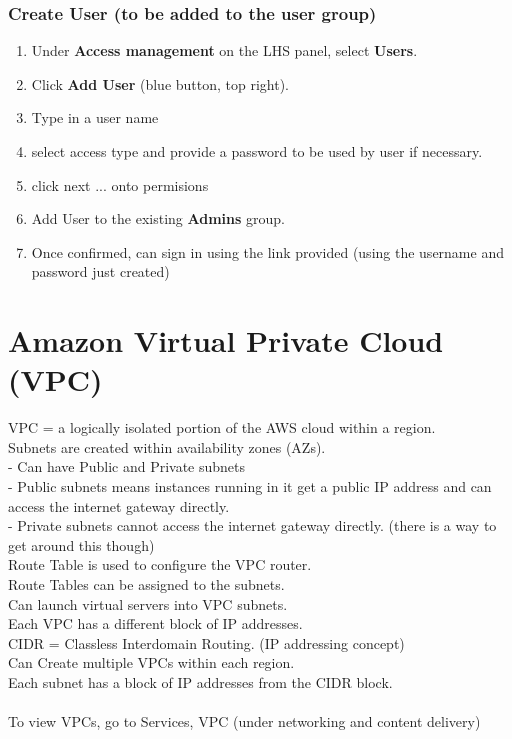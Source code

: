 \documentclass[11pt]{article}
\begin{document}
    \subsubsection{Create User (to be added to the user group)}
    \begin{enumerate}
        \item Under \textbf{Access management} on the LHS panel, select \textbf{Users}.
        \item Click \textbf{Add User} (blue button, top right).
        \item Type in a user name
        \item select access type and provide a password to be used by user if necessary.
        \item click next
        \subitem ... onto permisions
        \item Add User to the existing \textbf{Admins} group.
        \item Once confirmed, can sign in using the link provided (using the username and password just created)
    \end{enumerate}

    \section{Amazon Virtual Private Cloud (VPC)}
    VPC = a logically isolated portion of the AWS cloud within a region.
    \\
    Subnets are created within availability zones (AZs).
    \\
     - Can have Public and Private subnets
    \\
     - Public subnets means instances running in it get a public IP address and can access the internet gateway directly.
    \\
     - Private subnets cannot access the internet gateway directly.
    (there is a way to get around this though)
    \\
    Route Table is used to configure the VPC router.
    \\
    Route Tables can be assigned to the subnets.
    \\
    Can launch virtual servers into VPC subnets.
    \\
    Each VPC has a different block of IP addresses.
    \\
    CIDR = Classless Interdomain Routing.
    (IP addressing concept)
    \\
    Can Create multiple VPCs within each region.
    \\
    Each subnet has a block of IP addresses from the CIDR block.
    \\\\
    To view VPCs, go to Services, VPC (under networking and content delivery)
\end{document}
